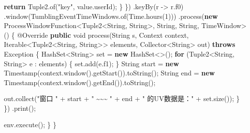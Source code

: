 \documentclass[cn,11pt,chinese]{elegantbook}
\newenvironment{Shaded}{}{}
\newcommand{\AttributeTok}[1]{\textcolor[rgb]{0.49,0.56,0.16}{#1}}
\newcommand{\BuiltInTok}[1]{#1}
\newcommand{\DataTypeTok}[1]{\textcolor[rgb]{0.56,0.13,0.00}{#1}}
\newcommand{\DecValTok}[1]{\textcolor[rgb]{0.25,0.63,0.44}{#1}}
\newcommand{\FunctionTok}[1]{\textcolor[rgb]{0.02,0.16,0.49}{#1}}
\newcommand{\KeywordTok}[1]{\textcolor[rgb]{0.00,0.44,0.13}{\textbf{#1}}}
\newcommand{\NormalTok}[1]{#1}
\newcommand{\StringTok}[1]{\textcolor[rgb]{0.25,0.44,0.63}{#1}}
\begin{document}
\begin{Shaded}
\begin{Highlighting}[]
                    \KeywordTok{return}\NormalTok{ Tuple2.}\FunctionTok{of}\NormalTok{(}\StringTok{"key"}\NormalTok{, value.}\FunctionTok{userId}\NormalTok{);}
\NormalTok{                \}}
\NormalTok{            \})}
\NormalTok{            .}\FunctionTok{keyBy}\NormalTok{(r {-}\textgreater{} r.}\FunctionTok{f0}\NormalTok{)}
\NormalTok{            .}\FunctionTok{window}\NormalTok{(TumblingEventTimeWindows.}\FunctionTok{of}\NormalTok{(}\BuiltInTok{Time}\NormalTok{.}\FunctionTok{hours}\NormalTok{(}\DecValTok{1}\NormalTok{)))}
\NormalTok{            .}\FunctionTok{process}\NormalTok{(}\KeywordTok{new}\NormalTok{ ProcessWindowFunction\textless{}Tuple2\textless{}}\BuiltInTok{String}\NormalTok{, }\BuiltInTok{String}\NormalTok{\textgreater{}, }\BuiltInTok{String}\NormalTok{, }\BuiltInTok{String}\NormalTok{, TimeWindow\textgreater{}() \{}
                \AttributeTok{@Override}
                \KeywordTok{public} \DataTypeTok{void} \FunctionTok{process}\NormalTok{(}\BuiltInTok{String}\NormalTok{ s, }\BuiltInTok{Context}\NormalTok{ context, }\BuiltInTok{Iterable}\NormalTok{\textless{}Tuple2\textless{}}\BuiltInTok{String}\NormalTok{, }\BuiltInTok{String}\NormalTok{\textgreater{}\textgreater{} elements, Collector\textless{}}\BuiltInTok{String}\NormalTok{\textgreater{} out) }\KeywordTok{throws} \BuiltInTok{Exception}\NormalTok{ \{}
                    \BuiltInTok{HashSet}\NormalTok{\textless{}}\BuiltInTok{String}\NormalTok{\textgreater{} set = }\KeywordTok{new} \BuiltInTok{HashSet}\NormalTok{\textless{}\textgreater{}();}
                    \KeywordTok{for}\NormalTok{ (Tuple2\textless{}}\BuiltInTok{String}\NormalTok{, }\BuiltInTok{String}\NormalTok{\textgreater{} e : elements) \{}
\NormalTok{                        set.}\FunctionTok{add}\NormalTok{(e.}\FunctionTok{f1}\NormalTok{);}
\NormalTok{                    \}}
                    \BuiltInTok{String}\NormalTok{ start = }\KeywordTok{new} \BuiltInTok{Timestamp}\NormalTok{(context.}\FunctionTok{window}\NormalTok{().}\FunctionTok{getStart}\NormalTok{()).}\FunctionTok{toString}\NormalTok{();}
                    \BuiltInTok{String}\NormalTok{ end = }\KeywordTok{new} \BuiltInTok{Timestamp}\NormalTok{(context.}\FunctionTok{window}\NormalTok{().}\FunctionTok{getEnd}\NormalTok{()).}\FunctionTok{toString}\NormalTok{();}

\NormalTok{                    out.}\FunctionTok{collect}\NormalTok{(}\StringTok{"窗口 "}\NormalTok{ + start + }\StringTok{" \textasciitilde{}\textasciitilde{}\textasciitilde{} "}\NormalTok{ + end + }\StringTok{" 的UV数据是："}\NormalTok{ + set.}\FunctionTok{size}\NormalTok{());}
\NormalTok{                \}}
\NormalTok{            \})}
\NormalTok{            .}\FunctionTok{print}\NormalTok{();}

\NormalTok{        env.}\FunctionTok{execute}\NormalTok{();}
\NormalTok{    \}}
\NormalTok{\}}
\end{Highlighting}
\end{Shaded}
\end{document}
